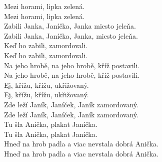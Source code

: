 

Mezi horami, \hspace{1cm}lipka zelená.\\
Mezi horami, lipka zelená.\\
Zabili Janka, Janíčka, Janka
miesto jele\hspace{0.5cm}ňa.\\
Zabili Janka, Janíčka, Janka, miesto jeleňa.\\

Keď ho zabili, zamordovali.\\
Keď ho zabili, zamordovali.\\
Na jeho hrobě, na jeho hrobě, kříž postavili.\\
Na jeho hrobě, na jeho hrobě, kříž postavili.\\

Ej, křížu, křížu, ukřižovaný.\\
Ej, křížu, křížu, ukřižovaný.\\
Zde leží Janík, Janíček, Janík zamordovaný.\\
Zde leží Janík, Janíček, Janík zamordovaný.\\

Tu šla Anička, plakat Janíčka.\\
Tu šla Anička, plakat Janíčka.\\
Hneď na hrob padla a viac nevstala dobrá Anička.\\
Hneď na hrob padla a viac nevstala dobrá Anička.

\newpage
